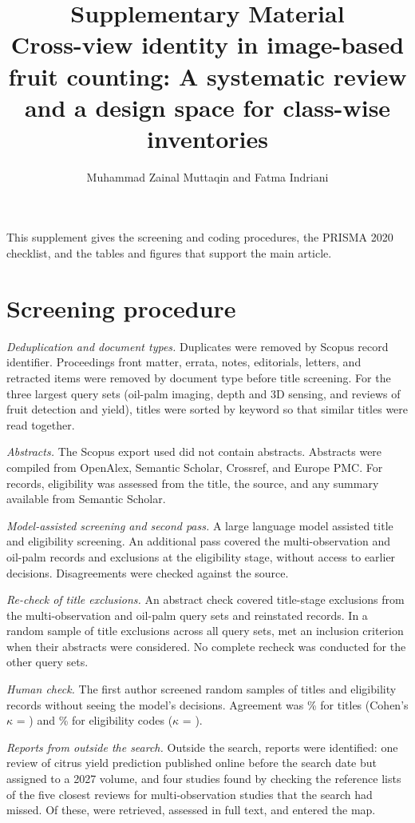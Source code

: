 \documentclass[a4paper,11pt]{article}
\title{Supplementary Material\\[4pt]\large Cross-view identity in image-based fruit counting: A systematic review and a design space for class-wise inventories}
\author{Muhammad Zainal Muttaqin and Fatma Indriani}
\date{}
\begin{document}
\maketitle

This supplement gives the screening and coding procedures, the PRISMA 2020 checklist, and the tables and figures that support the main article.

\section{Screening procedure}\label{sup:screening}

\textit{Deduplication and document types.} Duplicates were removed by Scopus record identifier. Proceedings front matter, errata, notes, editorials, letters, and retracted items were removed by document type before title screening. For the three largest query sets (oil-palm imaging, depth and 3D sensing, and reviews of fruit detection and yield), titles were sorted by keyword so that similar titles were read together.

\textit{Abstracts.} The Scopus export used did not contain abstracts. Abstracts were compiled from OpenAlex, Semantic Scholar, Crossref, and Europe PMC. For \nNoAbstract records, eligibility was assessed from the title, the source, and any summary available from Semantic Scholar.

\textit{Model-assisted screening and second pass.} A large language model assisted title and eligibility screening. An additional pass covered the multi-observation and oil-palm records and exclusions at the eligibility stage, without access to earlier decisions. Disagreements were checked against the source.

\textit{Re-check of title exclusions.} An abstract check covered \nTitleRecheck title-stage exclusions from the multi-observation and oil-palm query sets and reinstated \nTitleReinstated records. In a random sample of \nSampleTitles title exclusions across all query sets, \nSampleTitlesEligible met an inclusion criterion when their abstracts were considered. No complete recheck was conducted for the other query sets.

\textit{Human check.} The first author screened random samples of \nHumTitles titles and \nHumElig eligibility records without seeing the model's decisions. Agreement was \pHumTitles\% for titles (Cohen's $\kappa$ = \kHumTitles) and \pHumElig\% for eligibility codes ($\kappa$ = \kHumElig).

\textit{Reports from outside the search.} Outside the search, \nOther reports were identified: one review of citrus yield prediction published online before the search date but assigned to a 2027 volume, and four studies found by checking the reference lists of the five closest reviews for multi-observation studies that the search had missed. Of these, \nOtherRetrieved were retrieved, assessed in full text, and entered the map.
\end{document}
